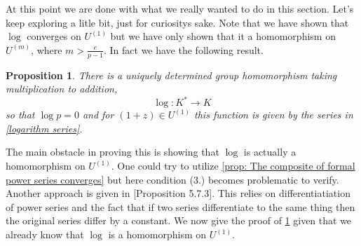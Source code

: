 \documentclass{article}
\newtheorem{proposition}{Proposition}[section]
\numberwithin{equation}{section}
\begin{document}
At this point we are done with what we really wanted to do in this section. Let's keep exploring a litle bit, just for curiositys sake. Note that we have shown that $\log$ converges on $U^{(1)}$ but we have only shown that it a homomorphism on $U^{(m)}$, where $m > \frac{e}{p-1}$. In fact we have the following result. 
\begin{proposition}\label{prop: Improved log}
    There is a uniquely determined group homomorphism taking multiplication to addition,
    $$\log : K^* \to K$$
    so that $\log p = 0$ and for $(1 + z) \in U^{(1)}$ this function is given by the series in \cref{logarithm series}.
\end{proposition}

The main obstacle in proving this is showing that $\log$ is actually a homomorphism on $U^{(1)}$. One could try to utilize \cref{prop: The composite of formal power series converges} but here condition (3.) becomes problematic to verify. Another approach is given in \citep{gouvea}[Proposition 5.7.3]. This relies on differentiatiation of power series and the fact that if two series differentiate to the same thing then the original series differ by a constant. We now give the proof of \cref{prop: Improved log} given that we already know that $\log$ is a homomorphism on $U^{(1)}$.
\end{document}
